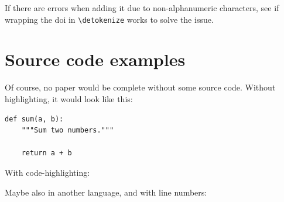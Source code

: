 \documentclass[letterpaper,compsoc,twoside,onecolumn]{IEEEtran}
\begin{document}
If there are errors when adding it due to non-alphanumeric characters,
see if wrapping the doi in \texttt{\textbackslash{}detokenize} works to
solve the issue.

\begin{Shaded}
\begin{Highlighting}[]
\NormalTok{\}}
\end{Highlighting}
\end{Shaded}

\hypertarget{source-code-examples}{%
\section{Source code examples}\label{source-code-examples}}

Of course, no paper would be complete without some source code. Without
highlighting, it would look like this:

\begin{verbatim}
def sum(a, b):
    """Sum two numbers."""

    return a + b
\end{verbatim}

With code-highlighting:

\begin{Shaded}
\begin{Highlighting}[]
 

    \OperatorTok{+}
\end{Highlighting}
\end{Shaded}

Maybe also in another language, and with line numbers:

\begin{Shaded}
\begin{Highlighting}[]
\OperatorTok{()} \OperatorTok{\{}
     \OperatorTok{(}\OperatorTok{=} \OperatorTok{;}\OperatorTok{\textless{}} \OperatorTok{;}\OperatorTok{++)} \OperatorTok{\{}
    \OperatorTok{\}}
     \OperatorTok{;}
\OperatorTok{\}}
\end{Highlighting}
\end{Shaded}
\end{document}
